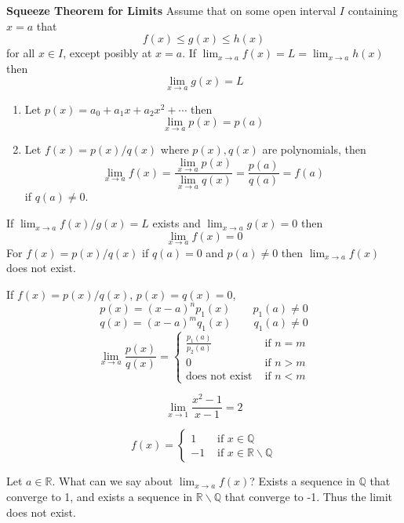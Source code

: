 \begin{thm}\textbf{Squeeze Theorem for Limits}
Assume that on some open interval $I$ containing $x=a$ that \[f(x) \leq g(x) \leq h(x)\] for all $x\in I$, except posibly at $x=a$. If $\lim_{x\to a} f(x) = L = \lim_{x\to a} h(x)$ then \[\lim_{x\to a} g(x) = L\] 
\end{thm}

\begin{rem}
\begin{enumerate}
\item Let $p(x) = a_0 + a_1x+a_2x^2 + \cdots$ then \[\lim_{x\to a} p(x) = p(a)\]
\item Let $f(x) = p(x)/q(x)$ where $p(x), q(x)$ are polynomials, then \[\lim_{x\to a} f(x) = \frac{\lim_{x\to a} p(x)}{\lim_{x\to a}q(x)} = \frac{p(a)}{q(a)} = f(a)\] if $q(a) \neq 0$.
\end{enumerate}
\end{rem}

\begin{note}
If $\lim_{x\to a} f(x)/g(x) = L$ exists and $\lim_{x\to a} g(x) = 0$ then \[\lim_{x\to a} f(x) = 0\]
For $f(x) = p(x)/q(x)$ if $q(a) = 0$ and $p(a) \neq 0$ then $\lim_{x\to a} f(x)$ does not exist.

If $f(x) = p(x)/q(x)$, $p(x) = q(x) = 0$,
\[p(x) = (x-a)^n p_1(x) \qquad p_1(a)\neq 0\]
\[q(x) = (x-a)^m q_1(x) \qquad q_1(a)\neq 0\]
\begin{equation*}
    \lim_{x\to a} \frac{p(x)}{q(x)} = \begin{cases}
    \frac{p_1(a)}{p_2(a)} & \text{ if } n=m \\
    0 & \text{ if } n>m \\
    \text{does not exist} & \text{ if } n <m
    \end{cases}
\end{equation*}
\end{note}



\begin{exmp}
\[\lim_{x\to 1} \frac{x^2-1}{x-1} = 2\]
\end{exmp}

\begin{exmp}
\begin{equation*}
   f(x) =  \begin{cases}
   1 & \text{ if } x\in \mathbb{Q} \\
   -1 & \text{ if } x\in \mathbb{R}\backslash\mathbb{Q}
    \end{cases}
\end{equation*}

Let $a\in \mathbb{R}$. What can we say about $\lim_{x\to a} f(x)$? Exists a sequence in $\mathbb{Q}$ that converge to 1, and exists a sequence in $\mathbb{R}\backslash\mathbb{Q}$ that converge to -1. Thus the limit does not exist.
\end{exmp}
